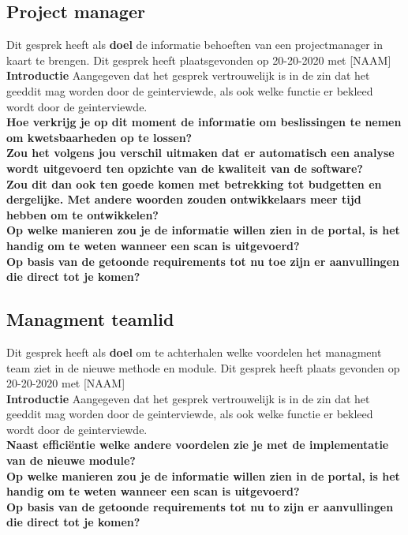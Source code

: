 \subsection{Project manager}\label{subsec:project-manager}
Dit gesprek heeft als \textbf{doel} de informatie behoeften van een projectmanager in kaart te brengen. Dit gesprek heeft plaatsgevonden op 20-20-2020 met [NAAM]
\\
\textbf{Introductie }
Aangegeven dat het gesprek vertrouwelijk is in de zin dat het geeddit mag worden door de geinterviewde, als ook welke functie er bekleed wordt door de geinterviewde.
\lipsum[01]
\\
\textbf{Hoe verkrijg je op dit moment de informatie om beslissingen te nemen om kwetsbaarheden op te lossen? }
\lipsum[01]\\
\textbf{Zou het volgens jou verschil uitmaken dat er automatisch een analyse wordt uitgevoerd ten opzichte van de kwaliteit van de software?}
\lipsum[01]
\\
\textbf{Zou dit dan ook ten goede komen met betrekking tot budgetten en dergelijke. Met andere woorden zouden ontwikkelaars meer tijd hebben om te ontwikkelen?}
\lipsum[01]
\\
\textbf{Op welke manieren zou je de informatie willen zien in de portal, is het handig om te weten wanneer een scan is uitgevoerd?}
\lipsum[01]
\\
\textbf{Op basis van de getoonde requirements tot nu toe zijn er aanvullingen die direct tot je komen?}
\lipsum[01]\\

\subsection{Managment teamlid}\label{subsec:managment-teamlid}
Dit gesprek heeft als \textbf{doel} om te achterhalen welke voordelen het managment team ziet in de nieuwe methode en module. Dit gesprek heeft plaats gevonden op 20-20-2020 met [NAAM]
\\
\textbf{Introductie }
Aangegeven dat het gesprek vertrouwelijk is in de zin dat het geeddit mag worden door de geinterviewde, als ook welke functie er bekleed wordt door de geinterviewde.
\lipsum[01]
\\
\textbf{Naast efficiëntie welke andere voordelen zie je met de implementatie van de nieuwe module?}
\lipsum[01]
\\
\textbf{Op welke manieren zou je de informatie willen zien in de portal, is het handig om te weten wanneer een scan is uitgevoerd?}
\lipsum[01]
\\
\textbf{Op basis van de getoonde requirements tot nu to zijn er aanvullingen die direct tot je komen?}
\lipsum[01]
\\



